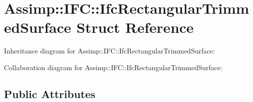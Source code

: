 \hypertarget{struct_assimp_1_1_i_f_c_1_1_ifc_rectangular_trimmed_surface}{\section{Assimp\+:\+:I\+F\+C\+:\+:Ifc\+Rectangular\+Trimmed\+Surface Struct Reference}
\label{struct_assimp_1_1_i_f_c_1_1_ifc_rectangular_trimmed_surface}
}


Inheritance diagram for Assimp\+:\+:I\+F\+C\+:\+:Ifc\+Rectangular\+Trimmed\+Surface\+:


Collaboration diagram for Assimp\+:\+:I\+F\+C\+:\+:Ifc\+Rectangular\+Trimmed\+Surface\+:
\subsection*{Public Attributes}
